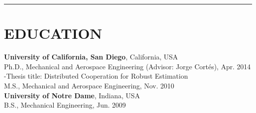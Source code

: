 \documentclass{res}
\begin{document}
\begin{resume}
 \vspace*{-3ex}
\hspace{-8.5ex}\rule{16.5cm}{0.4pt}
 \vspace*{-3ex}
\section{EDUCATION} 
\textbf{University of California, San Diego}, California, USA  \\
\vspace{0ex}
\quad Ph.D., Mechanical and Aerospace Engineering (Advisor: Jorge Cort\'es), Apr. 2014 \\
\vspace{0ex}
\qquad -Thesis title: Distributed Cooperation for Robust Estimation\\
\vspace{0ex}
%
\quad M.S., Mechanical and Aerospace Engineering, Nov. 2010\\
%
\vspace*{0ex}
\textbf{University of Notre Dame}, Indiana, USA \\
%
\vspace*{0ex}
\quad B.S., Mechanical Engineering, Jun. 2009
\vspace*{-3ex}

\end{resume}
\end{document}
